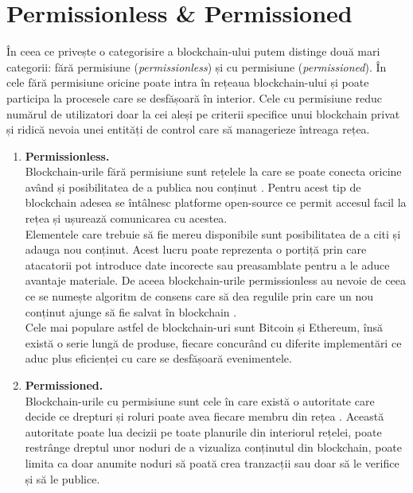 \section{Permissionless \& Permissioned}
\hfill

În ceea ce privește o categorisire a blockchain-ului putem distinge două mari categorii: fără permisiune (\textit{permissionless}) și cu permisiune (\textit{permissioned}). În cele fără permisiune oricine poate intra în rețeaua blockchain-ului și poate participa la procesele care se desfășoară în interior. Cele cu permisiune reduc numărul de utilizatori doar la cei aleși pe criterii specifice unui blockchain privat și ridică nevoia unei entități de control care să managerieze întreaga rețea.\\

\begin{enumerate}
    \item \textbf{Permissionless.} \\
    
    Blockchain-urile fără permisiune sunt rețelele la care se poate conecta oricine având și posibilitatea de a publica nou conținut \cite{Blockchain_Overview_NIST}. Pentru acest tip de blockchain adesea se întâlnesc platforme open-source ce permit accesul facil la rețea și ușurează comunicarea cu acestea.\\
    
    Elementele care trebuie să fie mereu disponibile sunt posibilitatea de a citi și adauga nou conținut. Acest lucru poate reprezenta o portiță prin care atacatorii pot introduce date incorecte sau preasamblate pentru a le aduce avantaje materiale. De aceea blockchain-urile permissionless au nevoie de ceea ce se numește algoritm de consens care să dea regulile prin care un nou conținut ajunge să fie salvat în blockchain \cite{Blockchain_Overview_NIST}.\\
    
    Cele mai populare astfel de blockchain-uri sunt Bitcoin și Ethereum, însă există o serie lungă de produse, fiecare concurând cu diferite implementări ce aduc plus eficienței cu care se desfășoară evenimentele.\\
    
    \item \textbf{Permissioned.} \\
    
    Blockchain-urile cu permisiune sunt cele în care există o autoritate care decide ce drepturi și roluri poate avea fiecare membru din rețea \cite{Blockchain_Overview_NIST}. Această autoritate poate lua decizii pe toate planurile din interiorul rețelei, poate restrânge dreptul unor noduri de a vizualiza conținutul din blockchain, poate limita ca doar anumite noduri să poată crea tranzacții sau doar să le verifice și să le publice.\\
    

\end{enumerate}
